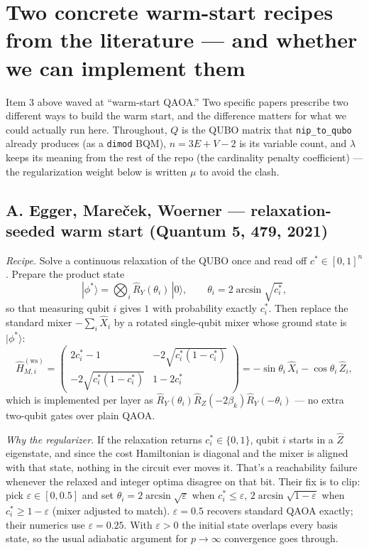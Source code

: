 \documentclass[11pt]{article}
\newcommand{\code}[1]{\texttt{#1}}
\begin{document}
\section{Two concrete warm-start recipes from the literature --- and whether we can implement them}

Item 3 above waved at ``warm-start QAOA.'' Two specific papers prescribe two different ways to build the warm start, and the difference matters for what we could actually run here. Throughout, $Q$ is the QUBO matrix that \code{nip\_to\_qubo} already produces (as a \code{dimod} BQM), $n = 3E + V - 2$ is its variable count, and $\lambda$ keeps its meaning from the rest of the repo (the cardinality penalty coefficient) --- the regularization weight below is written $\mu$ to avoid the clash.

\subsection*{A. Egger, Mare\v{c}ek, Woerner --- relaxation-seeded warm start (Quantum 5, 479, 2021)}

\emph{Recipe.} Solve a continuous relaxation of the QUBO once and read off $c^* \in [0,1]^n$. Prepare the product state
\[
|\phi^*\rangle = \bigotimes_i \hat R_Y(\theta_i)\,|0\rangle, \qquad \theta_i = 2\arcsin\sqrt{c_i^*},
\]
so that measuring qubit $i$ gives $1$ with probability exactly $c_i^*$. Then replace the standard mixer $-\sum_i \hat X_i$ by a rotated single-qubit mixer whose ground state is $|\phi^*\rangle$:
\[
\hat H^{(\mathrm{ws})}_{M,i} =
\begin{pmatrix} 2c_i^* - 1 & -2\sqrt{c_i^*(1-c_i^*)} \\ -2\sqrt{c_i^*(1-c_i^*)} & 1 - 2c_i^* \end{pmatrix}
= -\sin\theta_i\,\hat X_i - \cos\theta_i\,\hat Z_i ,
\]
which is implemented per layer as $\hat R_Y(\theta_i)\hat R_Z(-2\beta_k)\hat R_Y(-\theta_i)$ --- no extra two-qubit gates over plain QAOA.

\emph{Why the regularizer.} If the relaxation returns $c_i^* \in \{0,1\}$, qubit $i$ starts in a $\hat Z$ eigenstate, and since the cost Hamiltonian is diagonal and the mixer is aligned with that state, nothing in the circuit ever moves it. That's a reachability failure whenever the relaxed and integer optima disagree on that bit. Their fix is to clip: pick $\varepsilon \in [0, 0.5]$ and set $\theta_i = 2\arcsin\sqrt{\varepsilon}$ when $c_i^* \le \varepsilon$, $2\arcsin\sqrt{1-\varepsilon}$ when $c_i^* \ge 1-\varepsilon$ (mixer adjusted to match). $\varepsilon = 0.5$ recovers standard QAOA exactly; their numerics use $\varepsilon = 0.25$. With $\varepsilon > 0$ the initial state overlaps every basis state, so the usual adiabatic argument for $p \to \infty$ convergence goes through.
\end{document}

